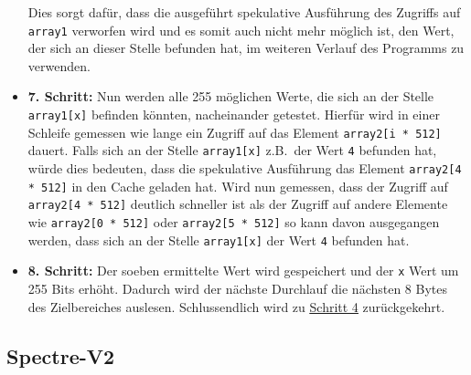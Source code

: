 \begin{itemize}
	      Dies sorgt dafür, dass die ausgeführt spekulative Ausführung des Zugriffs auf \texttt{array1} verworfen wird und es somit auch nicht mehr möglich ist, den Wert, der sich an dieser Stelle befunden hat, im weiteren Verlauf des Programms zu verwenden.
	\item \textbf{7. Schritt:} Nun werden alle 255 möglichen Werte, die sich an der Stelle \texttt{array1[x]} befinden könnten, nacheinander getestet.
	      Hierfür wird in einer Schleife gemessen wie lange ein Zugriff auf das Element \texttt{array2[i * 512]} dauert.
	      Falls sich an der Stelle \texttt{array1[x]} z.B.~der Wert \texttt{4} befunden hat, würde dies bedeuten, dass die spekulative Ausführung das Element \texttt{array2[4 * 512]} in den Cache geladen hat.
	      Wird nun gemessen, dass der Zugriff auf \texttt{array2[4 * 512]} deutlich schneller ist als der Zugriff auf andere Elemente wie \texttt{array2[0 * 512]} oder \texttt{array2[5 * 512]} so kann davon ausgegangen werden, dass sich an der Stelle \texttt{array1[x]} der Wert \texttt{4} befunden hat.
	\item \textbf{8. Schritt:} Der soeben ermittelte Wert wird gespeichert und der \texttt{x} Wert um 255 Bits erhöht.
	      Dadurch wird der nächste Durchlauf die nächsten 8 Bytes des Zielbereiches auslesen.
	      Schlussendlich wird zu \hyperref[itm:step4]{\underline{Schritt 4}} zurückgekehrt.
\end{itemize}

\subsection{Spectre-V2}
\label{subsec:spectre-v2}

